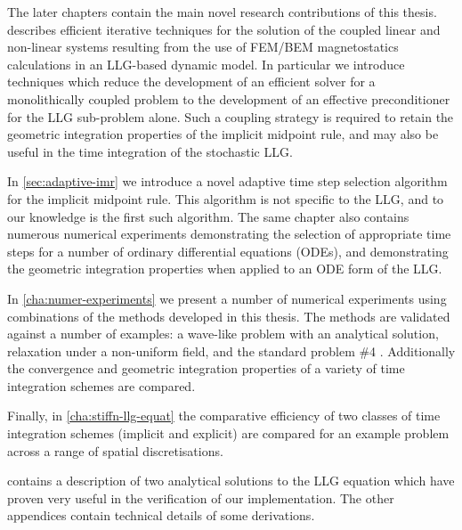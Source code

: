 The later chapters contain the main novel research contributions of this thesis.
 describes efficient iterative techniques for the solution of the coupled linear and non-linear systems resulting from the use of FEM/BEM magnetostatics calculations in an LLG-based dynamic model.
In particular we introduce techniques which reduce the development of an efficient solver for a monolithically coupled problem to the development of an effective preconditioner for the LLG sub-problem alone.
Such a coupling strategy is required to retain the geometric integration properties of the implicit midpoint rule, and may also be useful in the time integration of the stochastic LLG.

In \cref{sec:adaptive-imr} we introduce a novel adaptive time step selection algorithm for the implicit midpoint rule.
This algorithm is not specific to the LLG, and to our knowledge is the first such algorithm.
The same chapter also contains numerous numerical experiments demonstrating the selection of appropriate time steps for a number of ordinary differential equations (ODEs), and demonstrating the geometric integration properties when applied to an ODE form of the LLG.

In \cref{cha:numer-experiments} we present a number of numerical experiments using combinations of the methods developed in this thesis.
The methods are validated against a number of examples: a wave-like problem with an analytical solution, relaxation under a non-uniform field, and the \mumag standard problem \#4 \cite{mumag-website}.
Additionally the convergence and geometric integration properties of a variety of time integration schemes are compared.

Finally, in \cref{cha:stiffn-llg-equat} the comparative efficiency of two classes of time integration schemes (implicit and explicit) are compared for an example problem across a range of spatial discretisations.

 contains a description of two analytical solutions to the LLG equation which have proven very useful in the verification of our implementation.
The other appendices contain technical details of some derivations.


